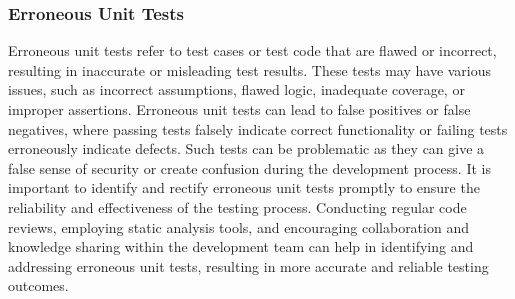 \subsubsection*{Erroneous Unit Tests}

Erroneous unit tests refer to test cases or test code that are flawed or incorrect, resulting in inaccurate or misleading test results. These tests may have various issues, such as incorrect assumptions, flawed logic, inadequate coverage, or improper assertions. Erroneous 
unit tests can lead to false positives or false negatives, where passing tests falsely indicate correct functionality or failing tests erroneously indicate defects. Such tests can be problematic as they can give a false sense of security or create confusion during the development 
process. It is important to identify and rectify erroneous unit tests promptly to ensure the reliability and effectiveness of the testing process. Conducting regular code reviews, employing static analysis tools, and encouraging collaboration and knowledge sharing within the 
development team can help in identifying and addressing erroneous unit tests, resulting in more accurate and reliable testing outcomes. \\


